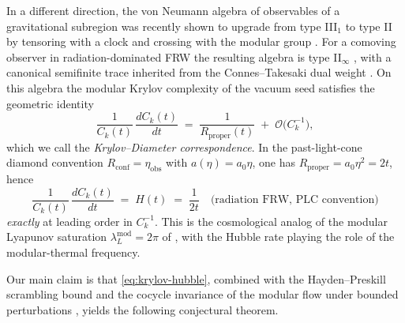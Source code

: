 \documentclass[11pt]{article}
\theoremstyle{definition}
\theoremstyle{remark}
\newcommand{\OO}{\mathcal{O}}
\begin{document}
In a different direction, the von Neumann algebra of observables of a
gravitational subregion was recently shown to upgrade from type
III$_1$ to type II by tensoring with a clock and crossing with the modular
group \cite{Witten22CrossedProduct,CLPW23,ChenPenington24}. For a comoving
observer in radiation-dominated FRW the resulting algebra is type II$_\infty$
\cite{frwnote}, with a canonical semifinite trace inherited from the
Connes--Takesaki dual weight \cite{ConnesTakesaki77}. On this algebra the
modular Krylov complexity \cite{CMPT24,Vardian26,AguilarGutierrez25} of the
vacuum seed satisfies the geometric identity \cite{piste1note}
\begin{equation}\label{eq:krylov-diameter}
  \frac{1}{C_k(t)}\,\frac{dC_k(t)}{dt}
   \;=\; \frac{1}{R_{\mathrm{proper}}(t)} \;+\; \OO\!\big(C_k^{-1}\big),
\end{equation}
which we call the \emph{Krylov--Diameter correspondence}. In the
past-light-cone diamond convention $R_{\mathrm{conf}}=\eta_{\mathrm{obs}}$
with $a(\eta)=a_0\eta$, one has $R_{\mathrm{proper}}=a_0\eta^2=2t$, hence
\begin{equation}\label{eq:krylov-hubble}
  \boxed{\;
    \frac{1}{C_k(t)}\,\frac{dC_k(t)}{dt}
     \;=\; H(t) \;=\; \frac{1}{2t}\quad
    \text{(radiation FRW, PLC convention)}
  \;}
\end{equation}
\emph{exactly} at leading order in $C_k^{-1}$. This is the cosmological
analog of the modular Lyapunov saturation $\lambda_L^{\mathrm{mod}}=2\pi$
of \cite{CMPT24}, with the Hubble rate playing the role of the
modular-thermal frequency.

Our main claim is that \eqref{eq:krylov-hubble}, combined with the
Hayden--Preskill scrambling bound and the cocycle invariance of the
modular flow under bounded perturbations \cite{Connes73}, yields the
following conjectural theorem.
\end{document}
